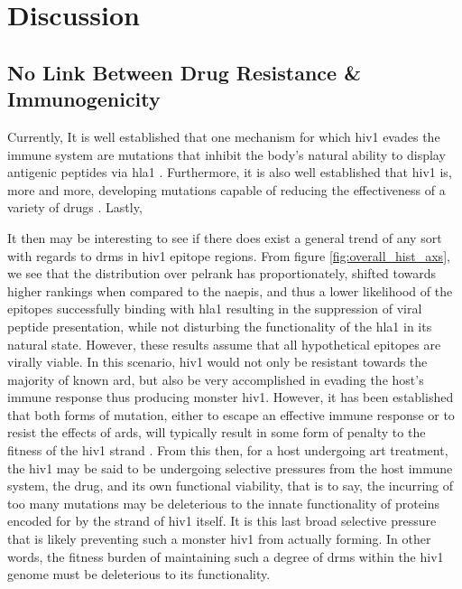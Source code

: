 \section{Discussion}

\subsection{No Link Between Drug Resistance \& Immunogenicity}

Currently, It is well established that one mechanism for which \ac{hiv1} evades the immune system are mutations that inhibit the body's natural ability to display antigenic peptides via \ac{hla1} \cite{varela-rohenaControlHIV1Immune2008}. Furthermore, it is also well established that \ac{hiv1} is, more and more, developing mutations capable of reducing the effectiveness of a variety of drugs \cite{clutterHIV1DrugResistance2016}. Lastly,

It then may be interesting to see if there does exist a general trend of any sort with regards to \acp{drm} in \ac{hiv1} epitope regions. From figure \ref{fig:overall_hist_axs}, we see that the distribution over \ac{pelrank} has proportionately, shifted towards higher rankings when compared to the \acp{naepi}, and thus a lower likelihood of the epitopes successfully binding with \ac{hla1} resulting in the suppression of viral peptide presentation, while not disturbing the functionality of the \ac{hla1} in its natural state. However, these results assume that all hypothetical epitopes are virally viable. In this scenario, \ac{hiv1} would not only be resistant towards the majority of known \ac{ard}, but also be very accomplished in evading the host's immune response thus producing monster \ac{hiv1}. However, it has been established that both forms of mutation, either to escape an effective immune response or to resist the effects of \acp{ard}, will typically result in some form of penalty to the fitness of the \ac{hiv1} strand \cite{clutterHIV1DrugResistance2016,woodmanHIVMolecularEpidemiology2009,leslieHIVEvolutionCTL2004}. From this then, for a host undergoing \ac{art} treatment, the \ac{hiv1} may be said to be undergoing selective pressures from the host immune system, the drug, and its own functional viability, that is to say, the incurring of too many mutations may be deleterious to the innate functionality of proteins encoded for by the strand of \ac{hiv1} itself. It is this last broad selective pressure that is likely preventing such a monster \ac{hiv1} from actually forming. In other words, the fitness burden of maintaining such a degree of \acp{drm} within the \ac{hiv1} genome must be deleterious to its functionality.

